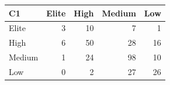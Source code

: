 \begin{tabular}{lrrrr}
\toprule
C1 & Elite & High & Medium & Low \\
\midrule
Elite & 3 & 10 & 7 & 1 \\
High & 6 & 50 & 28 & 16 \\
Medium & 1 & 24 & 98 & 10 \\
Low & 0 & 2 & 27 & 26 \\
\bottomrule
\end{tabular}
